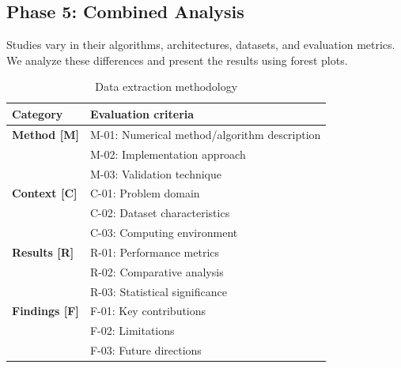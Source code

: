 \documentclass[acmsmall]{acmart}
\begin{document}
\subsection{Phase 5: Combined Analysis}\label{subsec:phase-5-combined-analysis}
Studies vary in their algorithms, architectures, datasets, and evaluation metrics. We analyze these differences and present the results using forest plots.

\begin{table}[ht]
    \centering
    \caption{Data extraction methodology}
    \label{tab:eval_framework}
    \begin{tabular}{>{\bfseries}ll}
        \toprule
        \textbf{Category} & \textbf{Evaluation criteria}                 \\
        \midrule
        Method [M]        & M-01: Numerical method/algorithm description \\
                          & M-02: Implementation approach                \\
                          & M-03: Validation technique                   \\
        \addlinespace
        Context [C]       & C-01: Problem domain                         \\
                          & C-02: Dataset characteristics                \\
                          & C-03: Computing environment                  \\
        \addlinespace
        Results [R]       & R-01: Performance metrics                    \\
                          & R-02: Comparative analysis                   \\
                          & R-03: Statistical significance               \\
        \addlinespace
        Findings [F]      & F-01: Key contributions                      \\
                          & F-02: Limitations                            \\
                          & F-03: Future directions                      \\
        \bottomrule
    \end{tabular}
\end{table}

\end{document}
